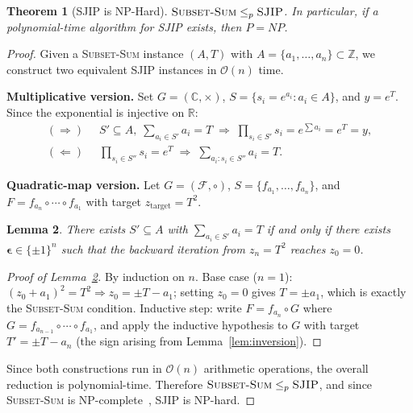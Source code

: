 \documentclass[journal,twocolumn]{IEEEtran}
\theoremstyle{definition}
\theoremstyle{plain}
\newtheorem{theorem}{Theorem}[section]
\newtheorem{lemma}[theorem]{Lemma}
\newcommand{\C}{\mathbb{C}}
\newcommand{\R}{\mathbb{R}}
\newcommand{\Z}{\mathbb{Z}}
\begin{document}
\begin{theorem}[SJIP is NP-Hard]
\label{thm:sjip_nphard}
$\textsc{Subset-Sum} \le_p \textsc{SJIP}$.  In particular,
if a polynomial-time algorithm for SJIP exists, then $P = NP$.
\end{theorem}

\begin{proof}
Given a \textsc{Subset-Sum} instance $(A, T)$ with
$A = \{a_1, \ldots, a_n\} \subset \Z$, we construct two equivalent
SJIP instances in $\mathcal{O}(n)$ time.

\medskip\noindent\textbf{Multiplicative version.}
Set $G = (\C, \times)$, $S = \{s_i = e^{a_i} : a_i \in A\}$,
and $y = e^T$.  Since the exponential is injective on $\R$:
\begin{align*}
  (\Rightarrow)\;&\;
  S' \subseteq A,\;\sum_{a_i \in S'} a_i = T
  \;\Longrightarrow\;
  \prod_{s_i \in S'} s_i = e^{\sum a_i} = e^T = y,\\
  (\Leftarrow)\;&\;
  \prod_{s_i \in S''} s_i = e^T
  \;\Longrightarrow\;
  \sum_{a_i : s_i \in S''} a_i = T.
\end{align*}

\medskip\noindent\textbf{Quadratic-map version.}
Let $G = (\mathcal{F}, \circ)$, $S = \{f_{a_1}, \ldots, f_{a_n}\}$,
and $F = f_{a_n} \circ \cdots \circ f_{a_1}$ with target
$z_{\mathrm{target}} = T^2$.

\begin{lemma}
\label{lem:main_iff}
There exists $S' \subseteq A$ with $\sum_{a_i \in S'} a_i = T$ if
and only if there exists $\boldsymbol\epsilon \in \{\pm1\}^n$ such
that the backward iteration from $z_n = T^2$ reaches $z_0 = 0$.
\end{lemma}

\begin{proof}[Proof of Lemma~\ref{lem:main_iff}]
By induction on $n$.  Base case ($n=1$): $(z_0 + a_1)^2 = T^2
\Rightarrow z_0 = \pm T - a_1$; setting $z_0 = 0$ gives $T = \pm
a_1$, which is exactly the \textsc{Subset-Sum} condition.  Inductive
step: write $F = f_{a_n} \circ G$ where $G = f_{a_{n-1}} \circ
\cdots \circ f_{a_1}$, and apply the inductive hypothesis to $G$
with target $T' = \pm T - a_n$ (the sign arising from Lemma~\ref{lem:inversion}).
\end{proof}

Since both constructions run in $\mathcal{O}(n)$ arithmetic
operations, the overall reduction is polynomial-time.  Therefore
$\textsc{Subset-Sum} \le_p \textsc{SJIP}$, and since
\textsc{Subset-Sum} is NP-complete~\cite{garey1979}, SJIP is NP-hard.
\end{proof}
\end{document}
